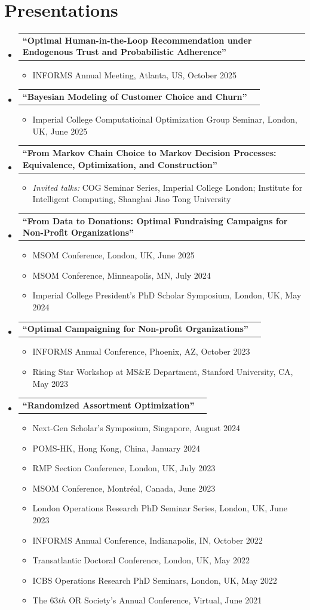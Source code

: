\documentclass[letterpaper,11pt]{article}
\newcommand{\resumeItem}[1]{
  \item\small{
    {#1 \vspace{-2pt}}
  }
}
\newcommand{\resumeProjectHeading}[2]{
    \item
    \begin{tabularx}{0.97\textwidth}{Xr}
      #1 & #2 \\
    \end{tabularx}\vspace{-7pt}
}
\newcommand{\resumeSubHeadingListStart}{\begin{itemize}[leftmargin=0.15in, label={}]}
\newcommand{\resumeSubHeadingListEnd}{\end{itemize}}
\newcommand{\resumeItemListStart}{\begin{itemize}[label=--]}
\newcommand{\resumeItemListEnd}{\end{itemize}\vspace{-5pt}}
\begin{document}
\section{Presentations}


    \resumeSubHeadingListStart
    \resumeProjectHeading
    {\bf ``Optimal Human-in-the-Loop Recommendation under Endogenous Trust and Probabilistic Adherence''}{}
    \resumeItemListStart
   \resumeItem{INFORMS Annual Meeting,  Atlanta,  US,  October 2025}
    \resumeItemListEnd

    \resumeProjectHeading
    {\bf ``Bayesian Modeling of Customer Choice and Churn''}{}
    \resumeItemListStart
   \resumeItem{Imperial College Computatioinal Optimization Group Seminar,  London,  UK,  June 2025}
    \resumeItemListEnd

    \resumeProjectHeading
    {\bf ``From Markov Chain Choice to Markov Decision Processes: Equivalence, Optimization, and Construction''}{}
    \resumeItemListStart
    \resumeItem{\textit{Invited talks:} COG Seminar Series, Imperial College London; Institute for Intelligent Computing, Shanghai Jiao Tong University}
    \resumeItemListEnd

    \newpage
     \resumeProjectHeading
    {\bf ``From Data to Donations: Optimal Fundraising Campaigns for Non-Profit Organizations''}{}
    \resumeItemListStart
    \resumeItem{MSOM Conference,  London, UK,  June 2025}
    \resumeItem{MSOM Conference,  Minneapolis, MN,  July 2024}
     \resumeItem{Imperial College President's PhD Scholar Symposium,  London,  UK,  May 2024}
    \resumeItemListEnd

    \resumeProjectHeading
    {\bf ``Optimal Campaigning for Non-profit Organizations''}{}
    \resumeItemListStart
    \resumeItem{INFORMS Annual Conference, Phoenix, AZ, October 2023}
    \resumeItem{Rising Star Workshop at MS\&E Department, Stanford University,  CA, May 2023}
    \resumeItemListEnd

    \resumeProjectHeading
    {\bf ``Randomized Assortment Optimization''}{}
    \resumeItemListStart
    \resumeItem{Next-Gen Scholar's Symposium, Singapore,  August 2024}
    \resumeItem{POMS-HK, Hong Kong, China,  January 2024}
    \resumeItem{RMP Section Conference, London, UK,  July 2023}    
    \resumeItem{MSOM Conference, Montr\'{e}al, Canada,  June 2023}
    \resumeItem{London Operations Research PhD Seminar Series, London, UK, June 2023}
    \resumeItem{INFORMS Annual Conference, Indianapolis, IN, October 2022}
    \resumeItem{Transatlantic Doctoral Conference, London, UK, May 2022}
    \resumeItem{ICBS Operations Research PhD Seminars, London, UK, May 2022}
    \resumeItem{The $63th$ OR Society's Annual Conference,  Virtual, June 2021} 
    \resumeItemListEnd
    \resumeSubHeadingListEnd
    
\end{document}
